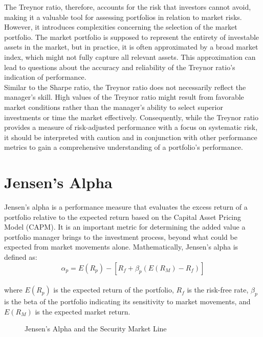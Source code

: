 \documentclass[a4paper,10pt]{article}
\begin{document}
\noindent The Treynor ratio, therefore, accounts for the risk that investors cannot avoid, making it a valuable tool for assessing portfolios in relation to market risks. However, it introduces complexities concerning the selection of the market portfolio. The market portfolio is supposed to represent the entirety of investable assets in the market, but in practice, it is often approximated by a broad market index, which might not fully capture all relevant assets. This approximation can lead to questions about the accuracy and reliability of the Treynor ratio's indication of performance. \\

\noindent Similar to the Sharpe ratio, the Treynor ratio does not necessarily reflect the manager's skill. High values of the Treynor ratio might result from favorable market conditions rather than the manager's ability to select superior investments or time the market effectively. Consequently, while the Treynor ratio provides a measure of risk-adjusted performance with a focus on systematic risk, it should be interpreted with caution and in conjunction with other performance metrics to gain a comprehensive understanding of a portfolio's performance. 


\section*{Jensen's Alpha}

\noindent Jensen's alpha is a performance measure that evaluates the excess return of a portfolio relative to the expected return based on the Capital Asset Pricing Model (CAPM). It is an important metric for determining the added value a portfolio manager brings to the investment process, beyond what could be expected from market movements alone. Mathematically, Jensen's alpha is defined as: \\
\[
\alpha_p = E(R_p) - \left[ R_f + \beta_p \left( E(R_M) - R_f \right) \right]
\] \\
\noindent where \( E(R_p) \) is the expected return of the portfolio, \( R_f \) is the risk-free rate, \( \beta_p \) is the beta of the portfolio indicating its sensitivity to market movements, and \( E(R_M) \) is the expected market return. \\


\begin{figure}[htbp!]
\centering
{}
\caption{Jensen's Alpha and the Security Market Line}
\end{figure}
\end{document}
